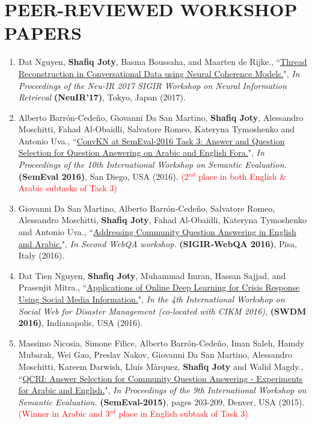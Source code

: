 \documentclass[paper=letter,fontsize=11pt]{scrartcl} %
\newcommand{\NewPart}[2]{\section*{\uppercase{#1} #2}}
\newcommand{\PaperEntry}[7]{
		\noindent #1, ``\href{#7}{#2}", \textit{#3} \textbf{#4}, #5 (#6).}
\begin{document}



\NewPart{Peer-Reviewed Workshop Papers}{}


\begin{enumerate}

\item \PaperEntry{Dat Nguyen, \textbf{Shafiq Joty}, Basma Boussaha, and Maarten de Rijke.}{Thread Reconstruction in Conversational Data using Neural Coherence Models.} {In Proceedings of the Neu-IR 2017 SIGIR Workshop on Neural Information Retrieval} {(NeuIR'17)} {Tokyo, Japan}{2017}
{https://raihanjoty.github.io/papers/nguyen-joty-boussaha-rijke-neuir-17.pdf}

\item \PaperEntry{Alberto Barrón-Cedeño, Giovanni Da San Martino, \textbf{Shafiq Joty}, Alessandro Moschitti, Fahad Al-Obaidli, Salvatore Romeo, Kateryna Tymoshenko and Antonio Uva.}{ConvKN at SemEval-2016 Task 3: Answer and Question Selection for Question Answering on Arabic and English Fora.} {In Proceedings of the 10th International Workshop on Semantic Evaluation.} {(SemEval 2016)} {San Diego, USA}{2016}
{https://aclweb.org/anthology/S/S16/S16-1138.pdf}
\textcolor{red}{(2$^{nd}$ place in both English \& Arabic subtasks of Task 3)}

\item \PaperEntry{Giovanni Da San Martino, Alberto Barrón-Cedeño, Salvatore Romeo, Alessandro Moschitti, \textbf{Shafiq Joty},  Fahad Al-Obaidli,  Kateryna Tymoshenko and Antonio Uva.}{Addressing Community Question Answering in English and Arabic.} {In Second WebQA workshop.} {(SIGIR-WebQA 2016)} {Pisa, Italy}{2016}
{http://plg2.cs.uwaterloo.ca/~avtyurin/WebQA2016/papers/invitedPaper2.pdf}

\item \PaperEntry{Dat Tien Nguyen, \textbf{Shafiq Joty}, Muhammad Imran, Hassan Sajjad, and Prasenjit Mitra.}{Applications of Online Deep Learning for Crisis Response Using Social Media Information.} {In the 4th International Workshop on Social Web for Disaster Management (co-located with CIKM 2016),} {(SWDM 2016)} {Indianapolis, USA}{2016}
{https://arxiv.org/abs/1610.01030}

\item \PaperEntry{Massimo Nicosia, Simone Filice, Alberto Barrón-Cedeño, Iman Saleh, Hamdy Mubarak, Wei Gao, Preslav Nakov, Giovanni Da San Martino, Alessandro Moschitti, Kareem Darwish, Lluís Màrquez, \textbf{Shafiq Joty} and Walid Magdy.}{QCRI: Answer Selection for Community Question Answering - Experiments for Arabic and English.} {In Proceedings of the 9th International Workshop on Semantic Evaluation.}{(SemEval-2015)}{pages 203-209, Denver, USA}{2015}
{http://qcri.org.qa/app/media/4829}
\textcolor{red}{(Winner in Arabic and 3$^{rd}$ place in English subtask of Task 3)}


\end{enumerate}
\end{document}
